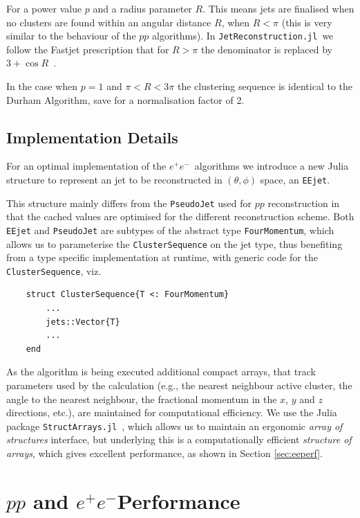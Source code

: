 \documentclass{webofc}
\newcommand{\JR}{\texttt{JetReconstruction.jl}}
\newcommand{\ee}{$e^+e^-$}
\begin{document}
For a power value $p$ and a radius parameter $R$. This means jets are finalised
when no clusters are found within an angular distance $R$, when $R<\pi$ (this is
very similar to the behaviour of the $pp$ algorithms). In \JR\ we follow the
Fastjet prescription that for $R>\pi$ the denominator is replaced by $3+\cos
R$~\cite{fastjetmanual}.

In the case when $p=1$ and $\pi < R < 3\pi$ the clustering sequence is identical
to the Durham Algorithm, save for a normalisation factor of 2.

\subsection{Implementation Details}
\label{eeimplementation}

For an optimal implementation of the \ee\ algorithms we introduce a new Julia
structure to represent an jet to be reconstructed in $(\theta, \phi)$ space, an \texttt{EEjet}.

This structure mainly differs from the \texttt{PseudoJet} used for $pp$
reconstruction in that the cached values are optimised for the different
reconstruction scheme. Both \texttt{EEjet} and \texttt{PseudoJet} are subtypes
of the abstract type \texttt{FourMomentum}, which allows us to parameterise the
\texttt{ClusterSequence} on the jet type, thus benefiting from a type specific
implementation at runtime, with generic code for the \texttt{ClusterSequence}, viz.

\begin{verbatim}
    struct ClusterSequence{T <: FourMomentum}
        ...
        jets::Vector{T}
        ...
    end
\end{verbatim}

As the algorithm is being executed additional compact arrays, that track
parameters used by the calculation (e.g., the nearest neighbour active cluster,
the angle to the nearest neighbour, the fractional momentum in the $x$, $y$ and
$z$ directions, etc.), are maintained for computational efficiency. We use the
Julia package \texttt{StructArrays.jl}~\cite{structarrays}, which allows us to
maintain an ergonomic \emph{array of structures} interface, but underlying this
is a computationally efficient \emph{structure of arrays}, which gives excellent
performance, as shown in Section \ref{sec:eeperf}.

\section{$pp$ and \ee Performance}
\label{sec:performance}
\end{document}
